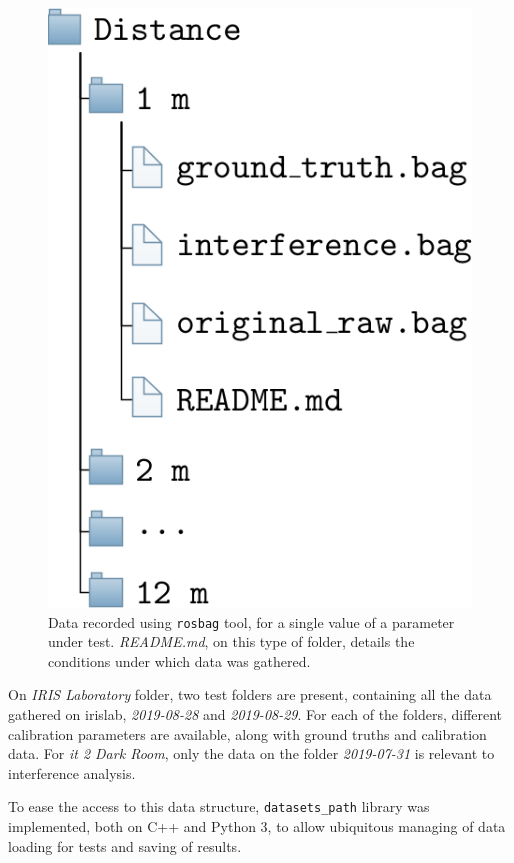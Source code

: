 \begin{figure}[H]
	\centering
	\includegraphics[scale=0.3]{img/datasets/parameter-test-files.png}
	\caption{Data recorded using \texttt{rosbag} tool, for a single value of a parameter under test. \textit{README.md}, on this type of folder, details the conditions under which data was gathered.}
	\label{fig:parameter-test-files}
\end{figure}


On \textit{IRIS Laboratory} folder, two test folders are present, containing all the data gathered on \ac{irislab}, \textit{2019-08-28} and \textit{2019-08-29}. For each of the folders, different calibration parameters are available, along with ground truths and calibration data. For \textit{\ac{it} 2 Dark Room}, only the data on the folder \textit{2019-07-31} is relevant to interference analysis.

To ease the access to this data structure, \texttt{datasets\_path} library was implemented, both on C++ and Python 3, to allow ubiquitous managing of data loading for tests and saving of results.


